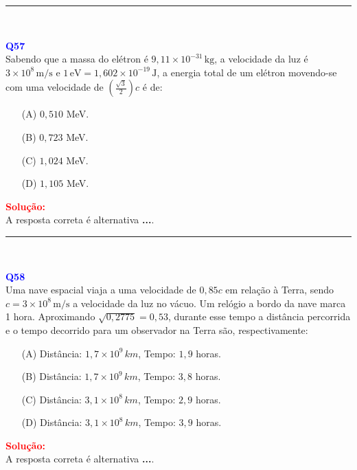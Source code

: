 \documentclass[a4paper,12pt]{article}
\begin{document}
\noindent\rule{\linewidth}{0.6pt}\\

\begin{flushleft}
\textbf{\textcolor{blue}{\Large Q57}}\\
\noindent
Sabendo que a massa do elétron é \( 9,11 \times 10^{-31}\, \mathrm{kg} \), a velocidade da luz é 
\( 3 \times 10^8\, \mathrm{m/s} \) e \( 1\,\mathrm{eV} = 1{,}602 \times 10^{-19}\, \mathrm{J} \), 
a energia total de um elétron movendo-se com uma velocidade de \( \left( \frac{\sqrt{3}}{2} \right) c \) é de:

\begin{itemize}
\item[(A)] $0{,}510$ MeV.
\item[(B)] $0{,}723$ MeV.
\item[(C)] $1{,}024$ MeV.
\item[(D)] $1{,}105$ MeV.
\end{itemize}

\vspace{0.5cm}

\textcolor{red}{\textbf{Solução:}}\\

A resposta correta é alternativa \colorbox{green!50}{\textbf{...}}.
\end{flushleft}

\noindent\rule{\linewidth}{0.6pt}\\

\begin{flushleft}
\textbf{\textcolor{blue}{\Large Q58}}\\
\noindent
Uma nave espacial viaja a uma velocidade de \(0{,}85c\) em relação à Terra, sendo \(c = 3 \times 10^8\, \mathrm{m/s}\) 
a velocidade da luz no vácuo. Um relógio a bordo da nave marca 1 hora. Aproximando \( \sqrt{0{,}2775} = 0{,}53 \), 
durante esse tempo a distância percorrida e o tempo decorrido para um observador na Terra são, respectivamente:


\begin{itemize}
\item[(A)] Distância: \(1{,}7 \times 10^9\, km\), Tempo: \(1{,}9\) horas.
\item[(B)] Distância: \(1{,}7 \times 10^9\, km\), Tempo: \(3{,}8\) horas.
\item[(C)] Distância: \(3{,}1 \times 10^8\, km\), Tempo: \(2{,}9\) horas.
\item[(D)] Distância: \(3{,}1 \times 10^8\, km\), Tempo: \(3{,}9\) horas.
\end{itemize}

\vspace{0.5cm}

\textcolor{red}{\textbf{Solução:}}\\

A resposta correta é alternativa \colorbox{green!50}{\textbf{...}}.
\end{flushleft}
\end{document}
